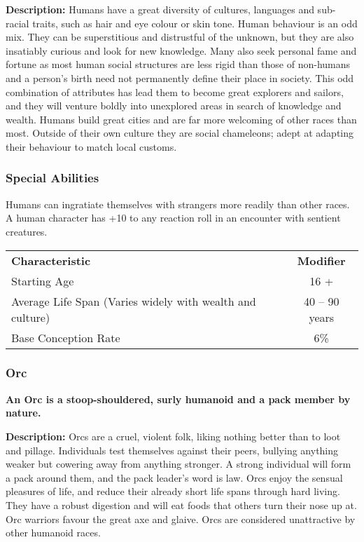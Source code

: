 \begin{multicols*}{3}
\textbf{Description:} Humans have a great diversity of cultures,
languages and sub-racial traits, such as hair and eye colour or skin
tone. Human behaviour is an odd mix.  They can be superstitious and
distrustful of the unknown, but they are also insatiably curious and
look for new knowledge.  Many also seek personal fame and fortune as
most human social structures are less rigid than those of non-humans
and a person's birth need not permanently define their place in
society.  This odd combination of attributes has lead them to become
great explorers and sailors, and they will venture boldly into
unexplored areas in search of knowledge and wealth.  Humans build
great cities and are far more welcoming of other races than most.
Outside of their own culture they are social chameleons; adept at
adapting their behaviour to match local customs.

\subsubsection{Special Abilities}

\begin{Enumerate}
\item
Humans can ingratiate themselves with strangers more readily than
other races.  A human character has +10 to any reaction roll in an
encounter with sentient creatures.
\end{Enumerate}
\begin{tabularx}{\linewidth}{Xc}
\textbf{Characteristic} & \textbf{Modifier} \\
Starting Age			& 16 + \\
Average Life Span (Varies widely with wealth and culture) & 40 -- 90 years \\
Base Conception Rate		& 6\% \\
\end{tabularx}

\subsubsection{Orc}

\textbf{An Orc is a stoop-shouldered, surly humanoid and a pack
member by nature.}

\textbf{Description:} Orcs are a cruel, violent folk, liking nothing
better than to loot and pillage. Individuals test themselves against
their peers, bullying anything weaker but cowering away from anything
stronger. A strong individual will form a pack around them, and the
pack leader's word is law. Orcs enjoy the sensual pleasures of life,
and reduce their already short life spans through hard living. They
have a robust digestion and will eat foods that others turn their nose
up at. Orc warriors favour the great axe and glaive. Orcs are
considered unattractive by other humanoid races.


\end{multicols*}
